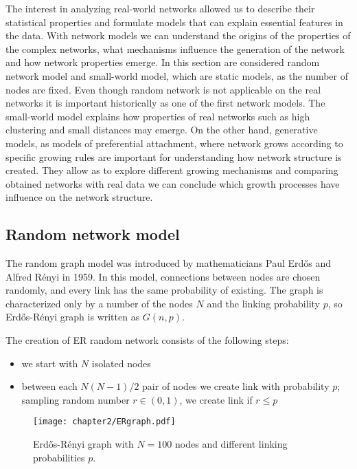 The interest in analyzing real-world networks allowed us to describe their statistical properties and formulate models that can explain essential features in the data. With network models we can understand the origins of the properties of the complex networks, what mechanisms influence the generation of the network and how network properties emerge. In this section are considered random network model and small-world model, which are static models, as the number of nodes are fixed. Even though random network is not applicable on the real networks it is important historically as one of the first network models. The small-world model explains how properties of real networks such as high clustering and small distances may emerge. On the other hand, generative models, as models of preferential attachment, where network grows according to specific growing rules are important for understanding how network structure is created. They allow as to explore different growing mechanisms and comparing obtained networks with real data we can conclude which growth processes have influence on the network structure.     

\subsection{Random network model}

The random graph model was introduced by mathematicians Paul Erdős and Alfred R\' {e}nyi in 1959. In this model, connections between nodes are chosen randomly, and every link has the same probability of existing. The graph is characterized only by a number of the nodes $N$ and the linking probability $p$, so Erdős-R\' {e}nyi graph is written as $G(n, p)$. 

The creation of ER random network consists of the following steps:
\begin{itemize}
	\item we start with $N$ isolated nodes
	\item between each $N(N-1)/2$ pair of nodes we create link with probability $p$; sampling random number $r \in (0,1)$, we create link if $r \leq p$    
\end{itemize}


\begin{figure}[H]
	\centering
	\texttt{[image: chapter2/ERgraph.pdf]}
	\caption[Erdős-R\' {e}nyi]{Erdős-R\' {e}nyi graph with $N=100$ nodes and different linking probabilities $p$.}
	\label{fig:erp}
\end{figure}

